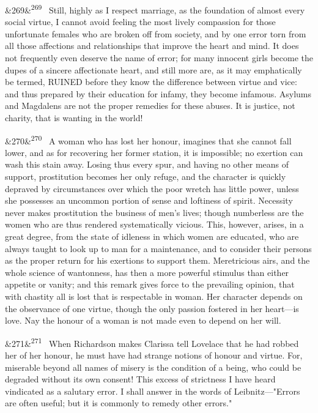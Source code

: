 \documentclass[12pt]{article}
\newcommand{\para}[1][]{\par\noindent\ifx&#1&\else\textsuperscript{\footnotesize #1}~\fi}
\begin{document}
\para[269] Still, highly as I respect marriage, as the foundation of almost every social virtue, I cannot avoid feeling the most lively compassion for those unfortunate females who are broken off from society, and by one error torn from all those affections and relationships that improve the heart and mind. It does not frequently even deserve the name of error; for many innocent girls become the dupes of a sincere affectionate heart, and still more are, as it may emphatically be termed, RUINED before they know the difference between virtue and vice: and thus prepared by their education for infamy, they become infamous. Asylums and Magdalens are not the proper remedies for these abuses. It is justice, not charity, that is wanting in the world!

\para[270] A woman who has lost her honour, imagines that she cannot fall lower, and as for recovering her former station, it is impossible; no exertion can wash this stain away. Losing thus every spur, and having no other means of support, prostitution becomes her only refuge, and the character is quickly depraved by circumstances over which the poor wretch has little power, unless she possesses an uncommon portion of sense and loftiness of spirit. Necessity never makes prostitution the business of men's lives; though numberless are the women who are thus rendered systematically vicious. This, however, arises, in a great degree, from the state of idleness in which women are educated, who are always taught to look up to man for a maintenance, and to consider their persons as the proper return for his exertions to support them. Meretricious airs, and the whole science of wantonness, has then a more powerful stimulus than either appetite or vanity; and this remark gives force to the prevailing opinion, that with chastity all is lost that is respectable in woman. Her character depends on the observance of one virtue, though the only passion fostered in her heart---is love. Nay the honour of a woman is not made even to depend on her will.

\para[271] When Richardson makes Clarissa tell Lovelace that he had robbed her of her honour, he must have had strange notions of honour and virtue. For, miserable beyond all names of misery is the condition of a being, who could be degraded without its own consent! This excess of strictness I have heard vindicated as a salutary error. I shall answer in the words of Leibnitz---"Errors are often useful; but it is commonly to remedy other errors."
\end{document}
